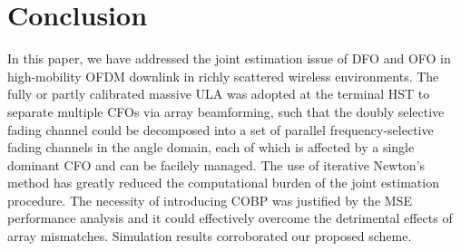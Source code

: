 \documentclass[12pt, draftclsnofoot, onecolumn]{IEEEtran}
\begin{document}
\section{Conclusion}
In this paper, we have addressed the joint estimation issue of DFO and OFO in high-mobility OFDM downlink in richly scattered wireless environments. The fully or partly calibrated massive ULA was adopted at the terminal HST to separate multiple CFOs via array beamforming, such that the doubly selective fading channel could be decomposed into a set of parallel frequency-selective fading channels in the angle domain, each of which is affected by a single dominant CFO and can be facilely managed. The use of iterative Newton's method has greatly reduced the computational burden of the joint estimation procedure. The necessity of introducing COBP was justified by the MSE performance analysis and it could effectively overcome the detrimental effects of array mismatches. Simulation results corroborated our proposed scheme.
\end{document}
